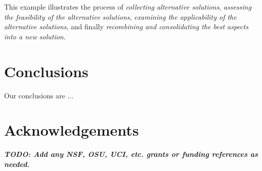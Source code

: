 \documentclass{ppig}
\newcommand{\todo}[1]{\textit{\textbf{\color{red}TODO: #1}}} %
\begin{document}
This example illustrates the process of \textit{collecting alternative solutions}, 
\textit{assessing the feasibility of the alternative solutions}, \textit{examining the applicability of the alternative solutions}, and finally \textit{recombining and consolidating the best aspects into a new solution}.

\section{Conclusions}
Our conclusions are ...


\section{Acknowledgements}
\todo{Add any NSF, OSU, UCI, etc. grants or funding references as needed.}


 
\end{document}
